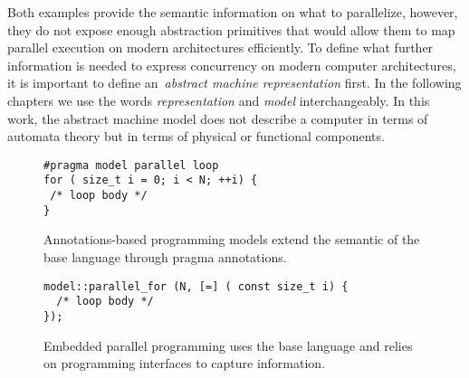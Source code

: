 Both examples provide the semantic information on what to parallelize, however, they do not expose enough abstraction primitives that would allow them to map parallel execution on modern architectures efficiently. To define what further information is needed to express concurrency on modern computer architectures, it is important to define an~\emph{abstract machine representation} first. In the following chapters we use the words \emph{representation} and \emph{model} interchangeably. In this work, the abstract machine model does not describe a computer in terms of automata theory but in terms of physical or functional components.

\begin{figure}
\begin{verbatim}
#pragma model parallel loop
for ( size_t i = 0; i < N; ++i) {
 /* loop body */
}
\end{verbatim}
\caption{Annotations-based programming models extend the semantic of the base language through pragma annotations.}
\label{figOMPLike}
\end{figure}

\begin{figure}
\begin{verbatim}
model::parallel_for (N, [=] ( const size_t i) {
  /* loop body */
});
\end{verbatim}
\caption{Embedded parallel programming uses the base language and relies on programming interfaces to capture information.}
\label{figKokkosLike}
\end{figure}
